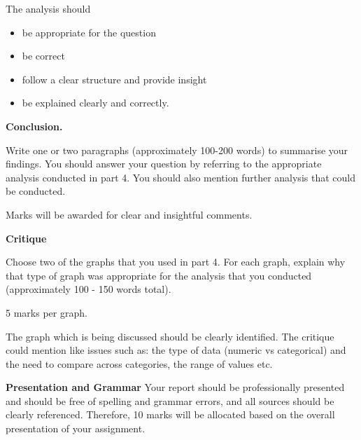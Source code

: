 \documentclass[11pt]{exam}
\newcommand{\MarkingNotes}[1]{}
\begin{document}
\begin{questions}
\begin{solution}[5mm]
\MarkingNotes{

  The students are expected to apply the analysis from weeks~1
  and~2.  However if they have done this and also apply some other
  technique (e.g. maps), then credit should be given.  }

\MarkingNotes{Markers do not need to replicate the analysis that the
  students perform, but should "eyeball".}

The analysis should
\begin{itemize}
\item be appropriate for the question
\item be correct
\item follow a clear structure and provide insight
\item be explained clearly and correctly.
\end{itemize}

\end{solution}

\question[15] \textbf{Conclusion.} \droptotalpoints

Write one or two paragraphs (approximately 100-200 words) to summarise
your findings. You should answer your question by referring to the
appropriate analysis conducted in part 4. You should also mention
further analysis that could be conducted.

\begin{solution}[5mm]
Marks will be awarded for clear and insightful comments.
\end{solution}

\question[10] \textbf{Critique}
\droptotalpoints

Choose two of the graphs that you used in part 4. For each graph,
explain why that type of graph was appropriate for the analysis that
you conducted (approximately 100 - 150 words total).


\begin{solution}[5mm]
5 marks per graph.

The graph which is being discussed should be clearly identified.  The
critique could mention like issues such as: the type of data (numeric
vs categorical) and the need to compare across categories, the range
of values etc.

\end{solution}

\question[10]  \textbf{Presentation and Grammar}
\droptotalpoints
Your report should be professionally presented and should be free of spelling and grammar errors, and all sources should be clearly referenced. %
Therefore, 10 marks will be allocated based on the overall presentation of your assignment.
    


\end{questions}
\end{document}
